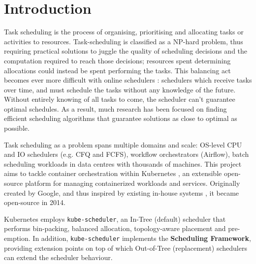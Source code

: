 \chapter{Introduction}
\label{firstcontentpage} %

%
%

Task scheduling is the process of organising, prioritising and allocating tasks
or activities to resources. Task-scheduling is classified as a NP-hard
problem, thus requiring practical solutions to juggle the quality of scheduling
decisions and the computation required to reach those decisions; resources spent
determining allocations could instead be spent performing the tasks. This
balancing act becomes ever more difficult with online schedulers
\cite{pruhs2004online}: schedulers which receive tasks over time, and must
schedule the tasks without any knowledge of the future. Without entirely knowing
of all tasks to come, the scheduler can't guarantee optimal schedules. As a
result, much research has been focused on finding efficient scheduling
algorithms that guarantee solutions as close to optimal as possible.

Task scheduling as a problem spans multiple domains and scale: OS-level CPU and
IO schedulers (e.g. CFQ and FCFS), workflow orchestrators (Airflow), batch
scheduling workloads in data centres with thousands of machines. This project
aims to tackle container orchestration within Kubernetes
\cite{kube-page}, an extensible open-source platform for managing
containerized workloads and services. Originally created by Google, and thus
inspired by existing in-house systems \cite{Borg}, it became open-source in
2014.

Kubernetes employs \verb|kube-scheduler|, an In-Tree (default) scheduler that
performs bin-packing, balanced allocation, topology-aware placement and
pre-emption. In addition, \verb|kube-scheduler| implements the \textbf{Scheduling
Framework}, providing extension points on top of which Out-of-Tree (replacement)
schedulers can extend the scheduler behaviour.

